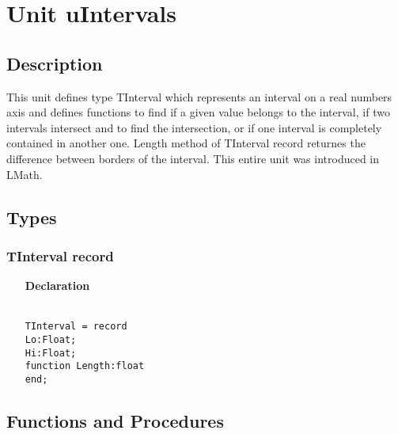 \documentclass[12pt,a4paper,oneside]{report}
\newcommand{\lmath}[1]{   %
	\marginpar{\vspace{#1} 
		\begin{flushright}
			LMath
	\end{flushright} }
}
\newcommand{\declarationitem}[1]{\textbf{#1}}
\newcommand{\code}[1]{\texttt{#1}}
\begin{document}
\section{Unit uIntervals}\lmath{-24pt}
\subsection{Description}
This unit defines type TInterval which represents an interval on a real numbers axis and defines functions to find if a given value belongs to the interval, if two intervals intersect and to find the intersection, or if one interval is completely contained in another one. Length method of TInterval record returnes the difference between borders of the interval. This entire unit was introduced in LMath.
\label{uIntervals}
\subsection{Types}
\subsubsection{TInterval record}
\begin{itemize}\label{uIntervals.TInterval}
\item[\declarationitem{Declaration}]
\begin{flushleft}
\code{\\
	TInterval = record \\
		\hspace{1cm}Lo:Float;\\
		\hspace{1cm}Hi:Float;\\
		\hspace{1cm}function Length:float\\
	end;}
\end{flushleft}
\end{itemize}
\subsection{Functions and Procedures}
\end{document}
